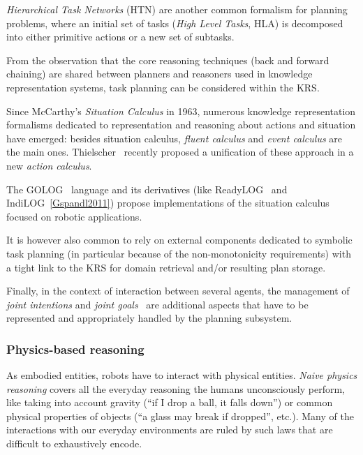 \emph{Hierarchical Task Networks} (HTN) are another common formalism for
planning problems, where an initial set of tasks (\emph{High Level Tasks}, HLA)
is decomposed into either primitive actions or a new set of subtasks.

From the observation that the core reasoning techniques (back and forward
chaining) are shared between planners and reasoners used in knowledge
representation systems, task planning can be considered within the KRS.

Since McCarthy's \emph{Situation Calculus} in 1963, numerous knowledge
representation formalisms dedicated to representation and reasoning about
actions and situation have emerged: besides situation calculus, \emph{fluent
calculus} and \emph{event calculus} are the main ones.
Thielscher~\cite{Thielscher2011} recently proposed a unification of these
approach in a new \emph{action calculus}.

The GOLOG~\cite{Levesque1997} language and its derivatives (like {\sc
ReadyLOG}~\cite{Ferrein2008} and {\sc IndiLOG}~\ref{Gspandl2011}) propose
implementations of the situation calculus focused on robotic applications.


It is however also common to rely on external components dedicated to symbolic task
planning (in particular because of the non-monotonicity requirements) with a
tight link to the KRS for domain retrieval and/or resulting plan storage.

Finally, in the context of interaction between several agents, the management
of \emph{joint intentions} and \emph{joint goals}~\cite{Tomasello2005,
Dominey2011} are additional aspects that have to be represented and
appropriately handled by the planning subsystem.


\subsubsection{Physics-based reasoning}
\label{sect|physics}

As embodied entities, robots have to interact with physical entities.
\emph{Naive physics reasoning} covers all the everyday reasoning the humans
unconsciously perform, like taking into account gravity (``if I drop a ball, it
falls down'') or common physical properties of objects (``a glass may break if
dropped'', etc.). Many of the interactions with our everyday environments are
ruled by such laws that are difficult to exhaustively encode.


